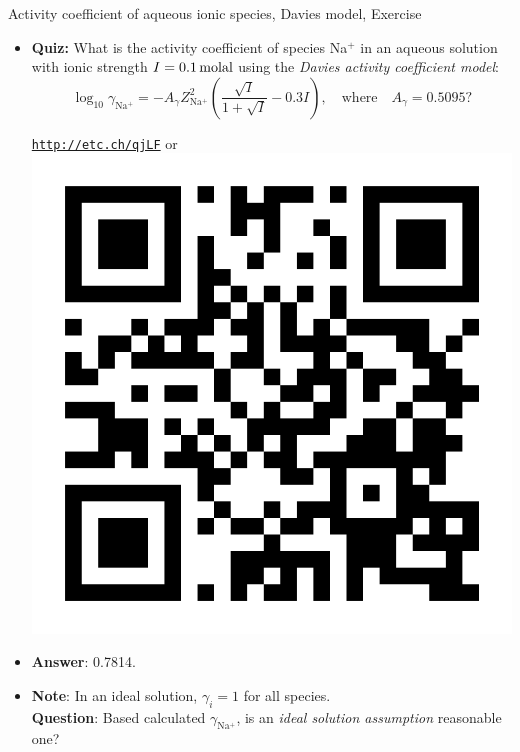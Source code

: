 \begin{frame}{Activity coefficient of aqueous ionic species, Davies model, Exercise}

\begin{itemize}
\item \alert{\textbf{Quiz:}} What is the activity coefficient of species Na$^{+}$ in an aqueous solution with ionic strength $I=\unit[0.1]{molal}$ using the \emph{Davies activity coefficient model}:
\[
\log_{10}\gamma_{\mathrm{Na^{+}}}=-A_{\gamma}Z_{\mathrm{Na^{+}}}^{2}\left(\dfrac{\sqrt{I}}{1+\sqrt{I}}-0.3I\right), \quad \mbox{where} \quad A_{\gamma}=0.5095?
\]
%
\begin{center}
\href{http://etc.ch/qjLF}{\textcolor{indigo(dye)}{\tt http://etc.ch/qjLF}} \quad or \quad 
\includegraphics[height=0.18\columnwidth]{figures/activity-models/poll-ionic-strength.png}
\end{center}
%
\hiddenpause
\item \textbf{Answer}: 0.7814.
\pause
\item \textbf{Note}: 
In an ideal solution, $\gamma_{i}=1$ for all species. \\
\textbf{Question}: Based calculated $\gamma_{\mathrm{Na^{+}}}$, is an \emph{ideal solution assumption } reasonable one?
\end{itemize}
\end{frame}
%
%
